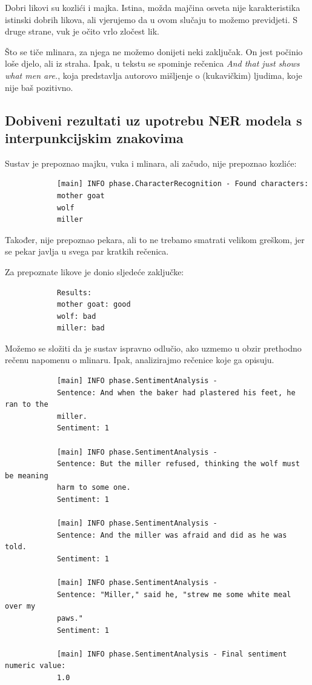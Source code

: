 \documentclass[a4paper,twoside,12pt]{memoir} %
\newcommand{\ti}[1]{\textit{#1\/}}
\begin{document}
		Dobri likovi su kozlići i majka. Istina, možda majčina osveta nije karakteristika istinski dobrih likova, ali vjerujemo da u ovom slučaju to možemo previdjeti. S druge strane, vuk je očito vrlo zločest lik.

		Što se tiče mlinara, za njega ne možemo donijeti neki zaključak. On jest počinio loše djelo, ali iz straha. Ipak, u tekstu se spominje rečenica \ti{And that just shows what men are.}, koja predstavlja autorovo mišljenje o (kukavičkim) ljudima, koje nije baš pozitivno.


		\subsection{Dobiveni rezultati uz upotrebu NER modela s interpunkcijskim znakovima}

		Sustav je prepoznao majku, vuka i mlinara, ali začudo, nije prepoznao kozliće:

		\begin{verbatim}
			[main] INFO phase.CharacterRecognition - Found characters:
			mother goat
			wolf
			miller
		\end{verbatim}

		Također, nije prepoznao pekara, ali to ne trebamo smatrati velikom greškom, jer se pekar javlja u svega par kratkih rečenica.

		Za prepoznate likove je donio sljedeće zaključke:

		\begin{verbatim}
			Results:
			mother goat: good
			wolf: bad
			miller: bad
		\end{verbatim}

		Možemo se složiti da je sustav ispravno odlučio, ako uzmemo u obzir prethodno rečenu napomenu o mlinaru. Ipak, analizirajmo rečenice koje ga opisuju.

		\begin{verbatim}
			[main] INFO phase.SentimentAnalysis -
			Sentence: And when the baker had plastered his feet, he ran to the
			miller.
			Sentiment: 1

			[main] INFO phase.SentimentAnalysis -
			Sentence: But the miller refused, thinking the wolf must be meaning
			harm to some one.
			Sentiment: 1

			[main] INFO phase.SentimentAnalysis -
			Sentence: And the miller was afraid and did as he was told.
			Sentiment: 1

			[main] INFO phase.SentimentAnalysis -
			Sentence: "Miller," said he, "strew me some white meal over my
			paws."
			Sentiment: 1

			[main] INFO phase.SentimentAnalysis - Final sentiment numeric value:
			1.0
		\end{verbatim}
\end{document}

